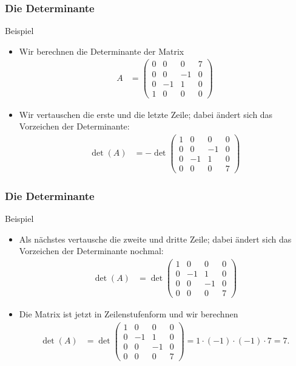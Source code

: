 \documentclass{beamer}
\renewcommand{\ae}{\"a}
\newcommand{\mytitle}{Die Determinante}
\begin{document}
\begin{frame}\frametitle{\mytitle}
	\begin{block}{Beispiel}
		\begin{itemize}
			\item Wir berechnen die Determinante der Matrix	
				\begin{align*}
					A&=\begin{pmatrix}
						0&0&0&7\\0&0&-1&0\\0&-1&1&0\\1&0&0&0
					\end{pmatrix}
				\end{align*}
			\item Wir vertauschen die erste und die letzte Zeile; dabei \ae ndert sich das Vorzeichen der Determinante:
\begin{align*}
	\det(A)&=-\det\begin{pmatrix}
						1&0&0&0\\0&0&-1&0\\0&-1&1&0\\0&0&0&7
					\end{pmatrix}
				\end{align*}
		\end{itemize}
	\end{block}
\end{frame}

\begin{frame}\frametitle{\mytitle}
	\begin{block}{Beispiel}
		\begin{itemize}
			\item Als n\ae chstes vertausche die zweite und dritte Zeile; dabei \ae ndert sich das Vorzeichen der Determinante nochmal:
\begin{align*}
	\det(A)&=\det\begin{pmatrix}
						1&0&0&0\\0&-1&1&0\\0&0&-1&0\\0&0&0&7
					\end{pmatrix}
				\end{align*}
			\item Die Matrix ist jetzt in Zeilenstufenform und wir berechnen
\begin{align*}
	\det(A)&=\det\begin{pmatrix}
						1&0&0&0\\0&-1&1&0\\0&0&-1&0\\0&0&0&7
					\end{pmatrix}=1\cdot(-1)\cdot(-1)\cdot 7=7.
				\end{align*}
		\end{itemize}
	\end{block}
\end{frame}
\end{document}
